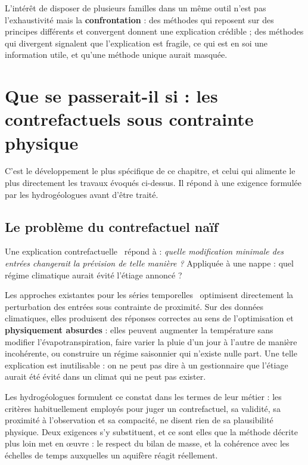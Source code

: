 L'intérêt de disposer de plusieurs familles dans un même outil n'est pas l'exhaustivité mais la
\textbf{confrontation} : des méthodes qui reposent sur des principes différents et convergent
donnent une explication crédible ; des méthodes qui divergent signalent que l'explication est
fragile, ce qui est en soi une information utile, et qu'une méthode unique aurait masquée.

\section{Que se passerait-il si : les contrefactuels sous contrainte physique}
\label{sec:physcf}

C'est le développement le plus spécifique de ce chapitre, et celui qui alimente le plus
directement les travaux évoqués ci-dessus. Il répond à une exigence formulée par les
hydrogéologues avant d'être traité.

\subsection{Le problème du contrefactuel naïf}

Une explication contrefactuelle~\cite{wachter2018counterfactual} répond à : \emph{quelle
modification minimale des entrées changerait la prévision de telle manière ?} Appliquée à une
nappe : quel régime climatique aurait évité l'étiage annoncé ?

Les approches existantes pour les séries temporelles~\cite{ates2021comte,wang2023forecastcf}
optimisent directement la perturbation des entrées sous contrainte de proximité. Sur des données
climatiques, elles produisent des réponses correctes au sens de l'optimisation et
\textbf{physiquement absurdes} : elles peuvent augmenter la température sans modifier
l'évapotranspiration, faire varier la pluie d'un jour à l'autre de manière incohérente, ou
construire un régime saisonnier qui n'existe nulle part. Une telle explication est
inutilisable : on ne peut pas dire à un gestionnaire que l'étiage aurait été évité dans un
climat qui ne peut pas exister.

Les hydrogéologues formulent ce constat dans les termes de leur métier : les critères
habituellement employés pour juger un contrefactuel, sa validité, sa proximité à l'observation
et sa compacité, ne disent rien de sa plausibilité physique. Deux exigences s'y substituent, et
ce sont elles que la méthode décrite plus loin met en œuvre : le respect du bilan de masse, et
la cohérence avec les échelles de temps auxquelles un aquifère réagit réellement.

